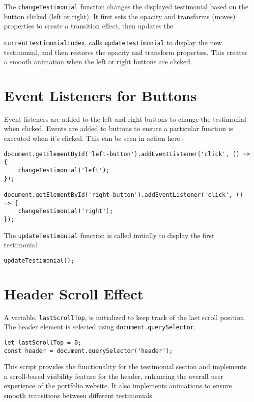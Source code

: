 \documentclass[15pt]{report}
\begin{document}
The \texttt{changeTestimonial} function changes the displayed testimonial based on the button clicked (left or right). It first sets the opacity and transforms (moves) properties to create a transition effect, then updates the

\texttt{currentTestimonialIndex}, calls \texttt{updateTestimonial} to display the new testimonial, and then restores the opacity and transform properties. This creates a smooth animation when the left or right buttons are clicked. 

\section{Event Listeners for Buttons}
Event listeners are added to the left and right buttons to change the testimonial when clicked. Events are added to buttons to ensure a particular function is executed when it's clicked. This can be seen in action here:- 

\begin{lstlisting}
document.getElementById('left-button').addEventListener('click', () => {
    changeTestimonial('left');
});

document.getElementById('right-button').addEventListener('click', () => {
    changeTestimonial('right');
});
\end{lstlisting}

The \texttt{updateTestimonial} function is called initially to display the first testimonial.

\begin{lstlisting}
updateTestimonial();
\end{lstlisting}

\section{Header Scroll Effect}
A variable, \texttt{lastScrollTop}, is initialized to keep track of the last scroll position. The header element is selected using \texttt{document.querySelector}.

\begin{lstlisting}
let lastScrollTop = 0;
const header = document.querySelector('header');
\end{lstlisting}

This script provides the functionality for the testimonial section and implements a scroll-based visibility feature for the header, enhancing the overall user experience of the portfolio website. It also implements animations to ensure smooth transitions between different testimonials. 
\end{document}
